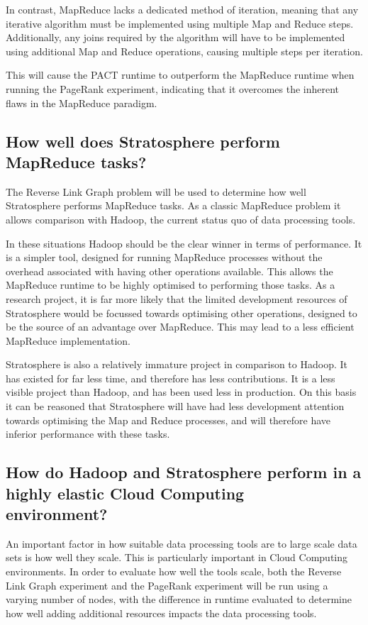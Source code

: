 In contrast, MapReduce lacks a dedicated method of iteration, meaning that any iterative algorithm must be implemented using multiple Map and Reduce steps. Additionally, any joins required by the algorithm will have to be implemented using additional Map and Reduce operations, causing multiple steps per iteration.

This will cause the PACT runtime to outperform the MapReduce runtime when running the PageRank experiment, indicating that it overcomes the inherent flaws in the MapReduce paradigm.

\tocless\subsection{How well does Stratosphere perform MapReduce tasks?}
The Reverse Link Graph problem will be used to determine how well Stratosphere performs MapReduce tasks. As a classic MapReduce problem it allows comparison with Hadoop, the current status quo of data processing tools.

In these situations Hadoop should be the clear winner in terms of performance. It is a simpler tool, designed for running MapReduce processes without the overhead associated with having other operations available. This allows the MapReduce runtime to be highly optimised to performing those tasks. As a research project, it is far more likely that the limited development resources of Stratosphere would be focussed towards optimising other operations, designed to be the source of an advantage over MapReduce. This may lead to a less efficient MapReduce implementation. 

Stratosphere is also a relatively immature project in comparison to Hadoop. It has existed for far less time, and therefore has less contributions. It is a less visible project than Hadoop, and has been used less in production. On this basis it can be reasoned that Stratosphere will have had less development attention towards optimising the Map and Reduce processes, and will therefore have inferior performance with these tasks.

\tocless\subsection{How do Hadoop and Stratosphere perform in a highly elastic Cloud Computing \\ environment?}
An important factor in how suitable data processing tools are to large scale data sets is how well they scale. This is particularly important in Cloud Computing environments. In order to evaluate how well the tools scale, both the Reverse Link Graph experiment and the PageRank experiment will be run using a varying number of nodes, with the difference in runtime evaluated to determine how well adding additional resources impacts the data processing tools. 

